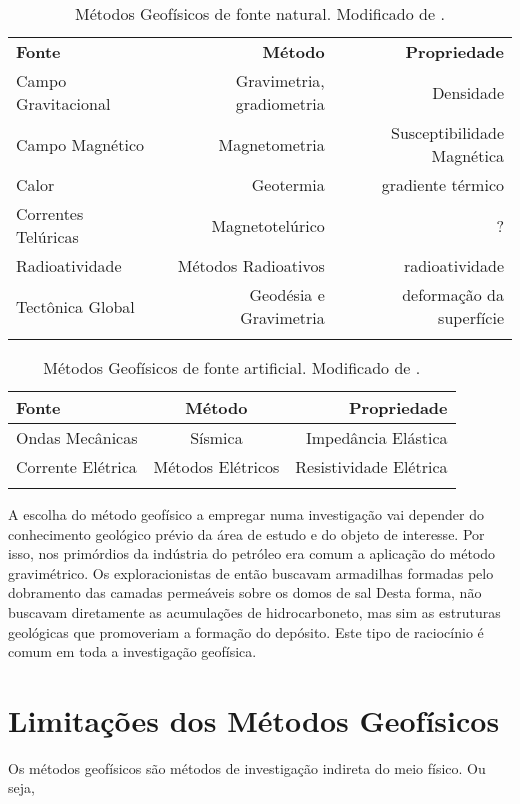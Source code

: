 \documentclass[a4paper,11pt]{scrbook}
\begin{document}
\begin{table}\centering
	\caption{M\'{e}todos Geof\'{i}sicos de fonte natural. Modificado de \cite{kearey_pt,telford_applied_1990}.}
	\begin{tabular}{lrr}
	\toprule
	\bfseries{Fonte}&\bfseries{M\'{e}todo}&\bfseries{Propriedade}\\
	Campo Gravitacional&Gravimetria, gradiometria&Densidade\\
	Campo Magn\'{e}tico&Magnetometria&Susceptibilidade Magn\'{e}tica\\
	Calor & Geotermia & gradiente t\'{e}rmico\\
	Correntes Tel\'{u}ricas& Magnetotel\'{u}rico&?\\
	Radioatividade&M\'{e}todos Radioativos&radioatividade\\
	Tect\^{o}nica Global&Geod\'{e}sia e Gravimetria&deforma\c{c}\~{a}o da superf\'{i}cie\\
	\bottomrule
	\label{tab:fontesnat}
	\end{tabular}
\end{table}


\begin{table}\centering
	\caption{M\'{e}todos Geof\'{i}sicos de fonte artificial. Modificado de \cite{kearey_pt,telford_applied_1990}.}
	\begin{tabular}{lcr}
	\bfseries{Fonte}&\bfseries{M\'{e}todo}&\bfseries{Propriedade}\\
\toprule
	Ondas Mec\^{a}nicas&S\'{i}smica&Imped\^{a}ncia El\'{a}stica\\
	Corrente El\'{e}trica& M\'{e}todos El\'{e}tricos&Resistividade El\'{e}trica\\
	\bottomrule
	\label{tab:fontesart}
	\end{tabular}
\end{table}

A escolha do m\'{e}todo geof\'{i}sico a empregar numa investiga\c{c}\~{a}o vai depender do conhecimento geol\'{o}gico pr\'{e}vio da \'{a}rea de estudo e do objeto de interesse.
Por isso, nos prim\'{o}rdios da ind\'{u}stria do petr\'{o}leo era comum a aplica\c{c}\~{a}o do m\'{e}todo gravim\'{e}trico.
Os exploracionistas de ent\~{a}o buscavam armadilhas formadas pelo dobramento das camadas perme\'{a}veis sobre os domos de sal
Desta forma, n\~{a}o buscavam diretamente as acumula\c{c}\~{o}es de hidrocarboneto, mas sim as estruturas geol\'{o}gicas que promoveriam a forma\c{c}\~{a}o do dep\'{o}sito.
Este tipo de racioc\'{i}nio \'{e} comum em toda a investiga\c{c}\~{a}o geof\'{i}sica.

\section{Limita\c{c}\~oes dos M\'etodos Geof\'isicos}

Os m\'etodos geof\'isicos s\~ao m\'etodos de investiga\c{c}\~ao indireta do meio f\'isico. 
Ou seja,



\end{document}
